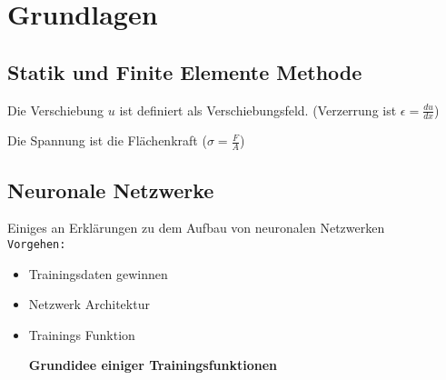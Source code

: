 \chapter{Grundlagen}

\section{Statik und Finite Elemente Methode}
Die Verschiebung $u$ ist definiert als Verschiebungsfeld. (Verzerrung ist $\epsilon = \frac{du}{dx}$)

Die Spannung ist die Flächenkraft ($\sigma = \frac{F}{A}$)
\section{Neuronale Netzwerke}
Einiges an Erklärungen zu dem Aufbau von neuronalen Netzwerken \\

\texttt{Vorgehen:}
\begin{itemize}
    \item Trainingsdaten gewinnen
    \item Netzwerk Architektur
    \item Trainings Funktion
    
\textbf{Grundidee einiger Trainingsfunktionen}
    
\end{itemize}
